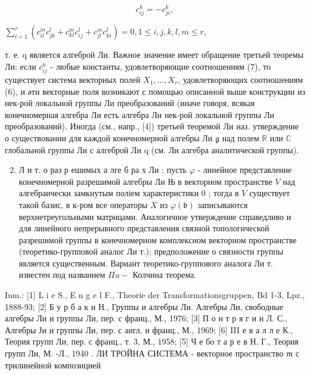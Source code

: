 \documentclass[10pt]{article}
\begin{document}
\[

c_{i j}^{k}=-c_{j i}^{k},

\]



$\sum_{l=1}^{r}\left(c_{i l}^{m} c_{j k}^{l}+c_{k l}^{m} c_{i j}^{l}+c_{j l}^{m} c_{k i}^{l}\right)=0,1 \leqslant i, j, k, l, m \leqslant r$,



т. е. q является алгеброй Ли. Важное значение имеет обращение третьей теоремы Ли: если $c_{i j}^{k}$ - любые константы, удовлетворяющие соотношениям (7), то существует система векторных полей $X_{1}, \ldots, X_{r}$, удовлетворяющих соотношениям (6), и әти векторные поля возникают с помощью описанной выше конструкции из нек-рой локальной группы Ли преобразований (иначе говоря, всякая конечномерная алгебра Ли есть алгебра Ли нек-рой локальной группы Ли преобразований). Иногда (см., напр., [4]) третьей теоремой Ли наз. утверждение о существовании для каждой конечномерной алгебры Ли $\mathfrak{g}$ над полем $\mathbb{R}$ или $\mathbb{C}$ глобальной группы Ли с алгеброй Ли q (см. Ли алгебра аналитической группы).



\begin{enumerate}

  \setcounter{enumi}{1}

  \item Л и т. о раз р ешимых а лге б ра х Ли : пусть $\varphi$ - линейное представление конечномерной разрешимой алгебры Ли Њ в векторном пространстве $V$ над алгебраически замкнутым поліем характеристики 0 ; тогда в $V$ существует такой базис, в к-ром все операторы $X$ из $\varphi(\mathfrak{b})$ записываются верхнетреугольными матрицами. Аналогичное утверждение справедливо и для линейного непрерывного представления связной топологической разрешимой группы в конечномерном комплексном векторном пространстве (теоретико-групповой аналог Ли т.); предположение о связности группы является существенным. Вариант теоретико-группового аналога Ли т. известен под названием $\Pi u-$ Колчина теорема.

\end{enumerate}



Ium.: [1] L i e S., E n g e l F., Theorie der Transformationsgruppen, Bd 1-3, Lpz., 1888-93; [2] Б у р б а к и Н., Группы и алгебры Ли. Алгебры Ли, свободные алгебры Ли и группы Ли, пер. с франц., М., 1976; [3] П о н т р я г и н Л. С., Алгебры Ји и группы Ли, пер. с англ. и франц., М., 1969; [6] III е в а л л е К., Теория групп Ли, пер. с франц., т. 3, М., 1958; [5] Ч е бо т а р е в Н. Г., Теория групп Ли, М. -Л., 1940 . ЛИ ТРОЙНА СИСТЕМА - векторное пространство $\mathfrak{m}$ с трилинейной композицией
\end{document}
